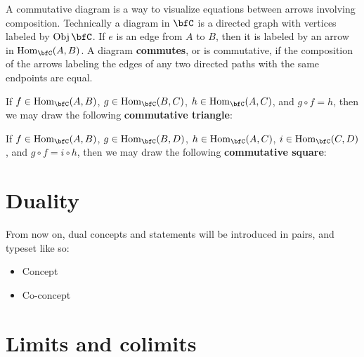 \documentclass[12pt,twoside,draft]{reedthesis}
\newcommand{\TODO}[1]{\marginpar{\footnotesize\color{TODO}todo: #1}}
\newcommand{\dual}[2]{
  \begin{itemize}\renewcommand{\labelitemi}{$\circ$}
    \itemsep0em
    \item #1
    \item #2
   \end{itemize}
}
\begin{document}
\begin{definition}\label{def:commutative-diagram}
  A commutative diagram is a way to visualize equations between arrows
  involving composition. Technically a diagram in $\bfC$ is a directed graph
  with vertices labeled by $\Obj\bfC$. If $e$ is an edge from $A$ to $B$, then it
  is labeled by an arrow in $\Hom_\bfC(A,B)$. A diagram \textbf{commutes}, or is
  commutative, if the composition of the arrows labeling the edges of any two
  directed paths with the same endpoints are equal.
  \TODO{better wording}
\end{definition}

\begin{example}\label{ex:commutative-diagram}
	If $f\in\Hom_{\bfC}(A,B)$, $g\in\Hom_{\bfC}(B,C)$, $h\in\Hom_{\bfC}(A,C)$,
  and $g\circ f=h$, then we may draw the following
  \textbf{commutative triangle}:
  \begin{center}
  \end{center}
	If $f\in\Hom_{\bfC}(A,B)$, $g\in\Hom_{\bfC}(B,D)$, $h\in\Hom_{\bfC}(A,C)$,
  $i\in\Hom_{\bfC}(C,D)$, and $g\circ f=i\circ h$, then we may draw the
  following \textbf{commutative square}:
  \begin{center}
  \end{center}
\end{example}

\section{Duality}
\label{sec:duality}

From now on, dual concepts and statements will be introduced in pairs, and
typeset like so:

\dual{
  Concept
}{
  Co-concept
}

\section{Limits and colimits}
\label{sec:limits-and-colimits}
\end{document}

